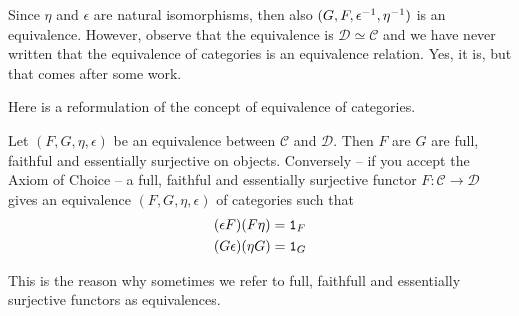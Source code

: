 Since \(\eta\) and \(\epsilon\) are natural isomorphisms, then also
\((G, F, \epsilon^{-1}, \eta^{-1})\) is an equivalence. However, observe that the
equivalence is \(\mathcal{D} \simeq \mathcal{C}\) and we have never written that the
equivalence of categories is an equivalence relation. Yes, it is, but
that comes after some work.

Here is a reformulation of the concept of equivalence of categories.

\begin{proposition}
  Let \((F, G, \eta, \epsilon)\) be an equivalence between \(\mathcal{C}\) and
  \(\mathcal{D}\). Then \(F\) are \(G\) are full, faithful and essentially
  surjective on objects. Conversely -- if you accept the {\sc Axiom of
    Choice} -- a full, faithful and essentially surjective functor
  \(F : \mathcal{C} \to \mathcal{D}\) gives an equivalence
  \((F, G, \eta, \epsilon)\) of categories such that
  \begin{align}
    & (\epsilon F)(F \eta) = \mathtt 1_F \label{eqn:TriId1} \\
    & (G \epsilon) (\eta G) = \mathtt 1_G \label{eqn:TriId2}
  \end{align}
\end{proposition}


This is the reason why sometimes we refer to full, faithfull and
essentially surjective functors as equivalences.

